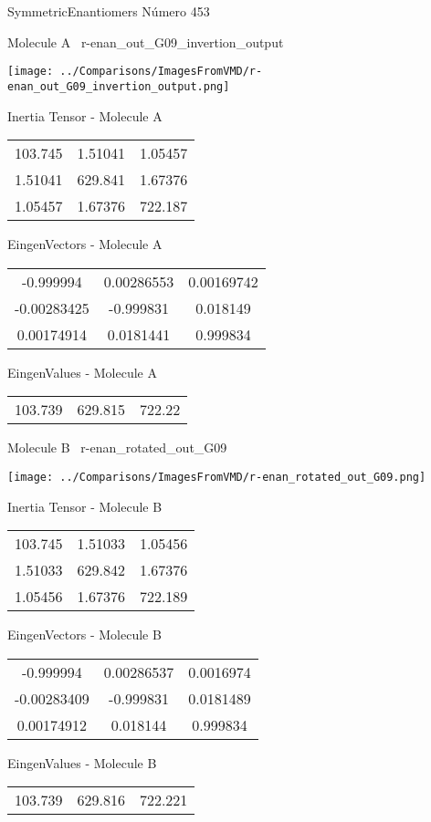 \vtab[-3cm]
\begin{center}
{\large SymmetricEnantiomers \tab Número 453}
\end{center}
\begin{multicols}{2}
\begin{center}

Molecule A \
r-enan\_out\_G09\_invertion\_output

\texttt{[image: ../Comparisons/ImagesFromVMD/r-enan\_out\_G09\_invertion\_output.png]}

Inertia Tensor - Molecule A \\
\begin{tabular}{|c c c|}
103.745	 & 	1.51041	 & 	1.05457	 \\
1.51041	 & 	629.841	 & 	1.67376	 \\
1.05457	 & 	1.67376	 & 	722.187
\end{tabular}

\vtab
 EingenVectors - Molecule A     \\
\begin{tabular}{|c c c|}
-0.999994	 & 	0.00286553	 & 	0.00169742	 \\
-0.00283425	 & 	-0.999831	 & 	0.018149	 \\
0.00174914	 & 	0.0181441	 & 	0.999834
\end{tabular}

\vtab
 EingenValues - Molecule A     \\
\begin{tabular}{|c c c|}
103.739	 & 	629.815	 & 	722.22	 \\
\end{tabular}
\columnbreak

Molecule B \
r-enan\_rotated\_out\_G09

\texttt{[image: ../Comparisons/ImagesFromVMD/r-enan\_rotated\_out\_G09.png]}

Inertia Tensor - Molecule B \\
\begin{tabular}{|c c c|}
103.745	 & 	1.51033	 & 	1.05456	 \\
1.51033	 & 	629.842	 & 	1.67376	 \\
1.05456	 & 	1.67376	 & 	722.189
\end{tabular}

\vtab
 EingenVectors - Molecule B     \\
\begin{tabular}{|c c c|}
-0.999994	 & 	0.00286537	 & 	0.0016974	 \\
-0.00283409	 & 	-0.999831	 & 	0.0181489	 \\
0.00174912	 & 	0.018144	 & 	0.999834
\end{tabular}

\vtab
 EingenValues - Molecule B     \\
\begin{tabular}{|c c c|}
103.739	 & 	629.816	 & 	722.221	 \\
\end{tabular}

\end{center}
\end{multicols}

